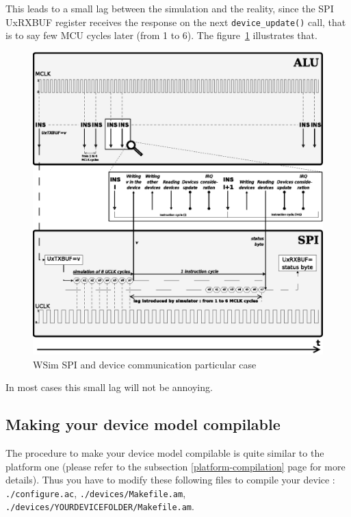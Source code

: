 \documentclass[a4paper,10pt]{report}
\begin{document}
This leads to a small lag between the simulation and the reality, since the SPI UxRXBUF register receives the response on the next \verb$device_update()$ call, that is to say few MCU cycles later (from 1 to 6).
The figure~\ref{wsim-spi-communication} illustrates that.\\

\begin{figure}[!h]
\begin{center}
  \includegraphics[scale=1]{figures/wsim_spi.eps}
\end{center}
\caption{WSim SPI and device communication particular case}
\label{wsim-spi-communication}
\end{figure}

In most cases this small lag will not be annoying.


\subsection{Making your device model compilable}
The procedure to make your device model compilable is quite similar to the platform one (please refer to the subsection \ref{platform-compilation} page \pageref{platform-compilation} for more details). Thus you have to modify these following files to compile your device : \verb$./configure.ac$, \verb$./devices/Makefile.am$, \verb$./devices/YOURDEVICEFOLDER/Makefile.am$.
\end{document}
